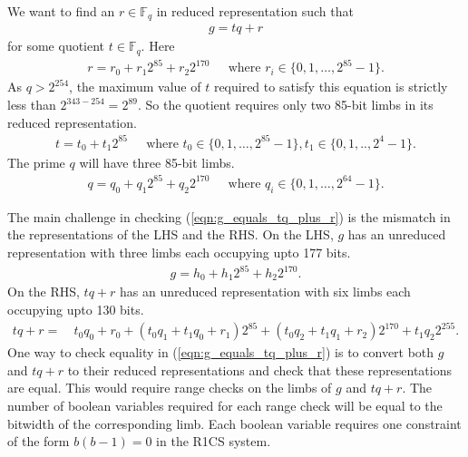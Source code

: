 \documentclass[a4paper, 12pt]{article}
\begin{document}
We want to find an $r \in \mathbb{F}_q$ in reduced representation such that 
\begin{align}
  g = tq+r
  \label{eqn:g_equals_tq_plus_r}
\end{align}
for some quotient $t \in \mathbb{F}_q$. Here
\begin{align*}
  r = r_0 + r_1 2^{85} + r_2 2^{170} \ \ \ \ \ \text{ where } r_i \in \{0,1,\ldots,2^{85}-1\}.
\end{align*}
As $q > 2^{254}$, the maximum value of $t$ required to satisfy this equation is strictly less than $2^{343-254} = 2^{89}$. So the quotient requires only two 85-bit limbs in its reduced representation.
\begin{align*}
  t = t_0 + t_1 2^{85} \ \ \ \ \ \text{ where } t_0 \in \{0,1,\ldots,2^{85}-1\}, t_1 \in \{0,1,..,2^4-1\}.
\end{align*}
The prime $q$ will have three 85-bit limbs.
\begin{align*}
  q = q_0 + q_1 2^{85} + q_2 2^{170} \ \ \ \ \ \text{ where } q_i \in \{0,1,\ldots,2^{64}-1\}.
\end{align*}

The main challenge in checking (\ref{eqn:g_equals_tq_plus_r}) is the mismatch in the representations of the LHS and the RHS. On the LHS, $g$ has an unreduced representation with three limbs each occupying upto 177 bits.
\begin{align*}
   g = h_0 + h_1 2^{85} + h_2 2^{170}.
\end{align*}
On the RHS, $tq+r$ has an unreduced representation with six limbs each occupying upto 130 bits.
\begin{align*}
  tq+r  =&\ t_0q_0+r_0 + (t_0q_1 + t_1q_0 + r_1) 2^{85} + (t_0q_2 + t_1q_1 + r_2) 2^{170}+ t_1q_2 2^{255}.
\end{align*}
One way to check equality in (\ref{eqn:g_equals_tq_plus_r}) is to convert both $g$ and $tq+r$ to their reduced representations and check that these representations are equal. This would require range checks on the limbs of $g$ and $tq+r$. The number of boolean variables required for each range check will be equal to the bitwidth of the corresponding limb. Each boolean variable requires one constraint of the form $b(b-1) = 0$ in the R1CS system.
\end{document}
